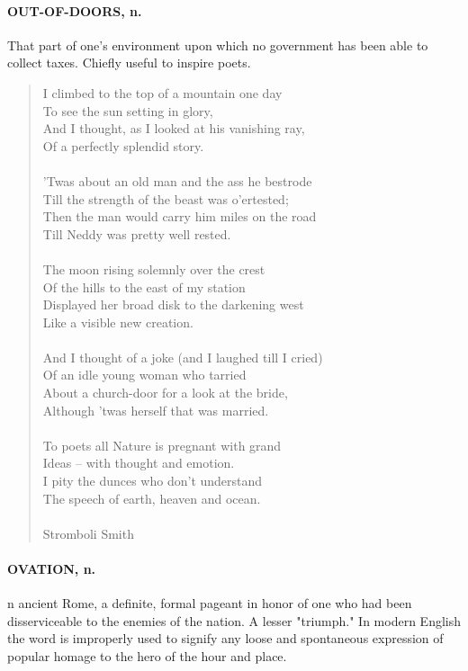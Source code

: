 \documentclass[11pt]{article}
\begin{document}
\paragraph{OUT-OF-DOORS, n.}  That part of one's environment upon which no
government has been able to collect taxes.  Chiefly useful to inspire
poets.

\begin{quote}   I climbed to the top of a mountain one day \\
      To see the sun setting in glory, \\
  And I thought, as I looked at his vanishing ray, \\
      Of a perfectly splendid story. \\
 \\
  'Twas about an old man and the ass he bestrode \\
      Till the strength of the beast was o'ertested; \\
  Then the man would carry him miles on the road \\
      Till Neddy was pretty well rested. \\
 \\
  The moon rising solemnly over the crest \\
      Of the hills to the east of my station \\
  Displayed her broad disk to the darkening west \\
      Like a visible new creation. \\
 \\
  And I thought of a joke (and I laughed till I cried) \\
      Of an idle young woman who tarried \\
  About a church-door for a look at the bride, \\
      Although 'twas herself that was married. \\
 \\
  To poets all Nature is pregnant with grand \\
      Ideas -- with thought and emotion. \\
  I pity the dunces who don't understand \\
      The speech of earth, heaven and ocean. \\
 \\
Stromboli Smith \end{quote}


\paragraph{OVATION, n.}  n ancient Rome, a definite, formal pageant in honor of
one who had been disserviceable to the enemies of the nation.  A
lesser "triumph."  In modern English the word is improperly used to
signify any loose and spontaneous expression of popular homage to the
hero of the hour and place.
\end{document}

